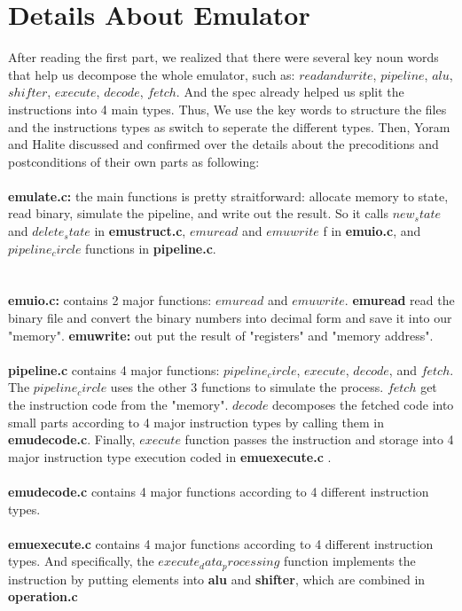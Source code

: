 \documentclass[a4paper]{article}
\begin{document}
\section{Details About Emulator}
After reading the first part, we realized that there were several key noun words that help us decompose the whole emulator, such as: $read and write$, $pipeline$, $alu$, $shifter$, $execute$, $decode$, $fetch$. And the spec already helped us split the instructions into 4 main types. Thus, We use the key words to structure the files and the instructions types as switch to seperate the different types. Then, Yoram and Halite discussed and confirmed over the details about the precoditions and postconditions of their own parts as following:
\\\\
\textbf{emulate.c:} the main functions is pretty straitforward: allocate memory to state, read binary, simulate the pipeline, and write out the result. So it calls $new_state$ and $delete_state$ in \textbf{emustruct.c}, $emuread$ and $emuwrite$ f in \textbf{emuio.c}, and $pipeline_circle$ functions in \textbf{pipeline.c}.\\
\\\\
\textbf{emuio.c:} contains 2 major functions: $emuread$ and $emuwrite$. \textbf{emuread} read the binary file and convert the binary numbers into decimal form and save it into our "memory".
\textbf{emuwrite:} out put the result of "registers" and "memory address".
\\\\
\textbf{pipeline.c} contains 4 major functions: $pipeline_circle$, $execute$, $decode$, and $fetch$. The $pipeline_circle$ uses the other 3 functions to simulate the process. $fetch$ get the instruction code from the "memory". $decode$ decomposes the fetched code into small parts according to 4 major instruction types by calling them in \textbf{emudecode.c}. Finally, $execute$ function passes the instruction and storage into 4 major instruction type execution coded in \textbf{emuexecute.c} .
\\\\
\textbf{emudecode.c} contains 4 major functions according to 4 different instruction types.
\\\\
\textbf{emuexecute.c} contains 4 major functions according to 4 different instruction types. And specifically, the $execute_data_processing$ function implements the instruction by putting elements into \textbf{alu} and \textbf{shifter}, which are combined in \textbf{operation.c}\\
\end{document}
